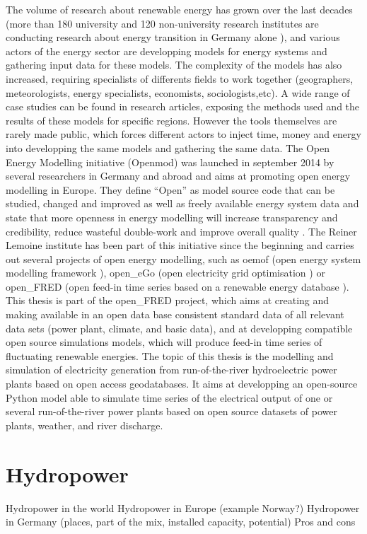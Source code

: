 The volume of research about renewable energy has grown over the last decades (more than 180 university and 120 non-university research institutes are conducting research about energy transition in Germany alone \cite{bmbf_energiewende}), and various actors of the energy sector are developping models for energy systems and gathering input data for these models. The complexity of the models has also increased, requiring specialists of differents fields to work together (geographers, meteorologists, energy specialists, economists, sociologists,etc). A wide range of case studies can be found in research articles, exposing the methods used and the results of these models for specific regions. However the tools themselves are rarely made public, which forces different actors to inject time, money and energy into developping the same models and gathering the same data. \newline
The Open Energy Modelling initiative (Openmod) was launched in september 2014 by several researchers in Germany and abroad \cite{openmod_workshop} and aims at promoting open energy modelling in Europe. They define “Open” as model source code that can be studied, changed and improved as well as freely available energy system data and state that more openness in energy modelling will increase transparency and credibility, reduce wasteful double-work and improve overall quality \cite{openmod_manifesto}. \newline
The Reiner Lemoine institute has been part of this initiative since the beginning and  carries out several projects of open energy modelling, such as oemof (open energy system modelling framework \cite{rli_oemof}), open\_eGo (open electricity grid optimisation \cite{rli_openego}) or open\_FRED (open feed-in time series based on a renewable energy database \cite{rli_openfred}). This thesis is part of the open\_FRED project, which aims at creating and making available in an open data base consistent standard data of all relevant data sets (power plant, climate, and basic data), and at developping compatible open source simulations models, which will produce feed-in time series of fluctuating renewable energies. \newline
The topic of this thesis is the modelling and simulation of electricity generation from run-of-the-river hydroelectric power plants based on open access geodatabases. It aims at developping an open-source Python model able to simulate time series of the electrical output of one or several run-of-the-river power plants based on open source datasets of power plants, weather, and river discharge.


\section{Hydropower}
Hydropower in the world \newline
Hydropower in Europe (example Norway?) \newline
Hydropower in Germany (places, part of the mix, installed capacity, potential) \newline
Pros and cons \newline

